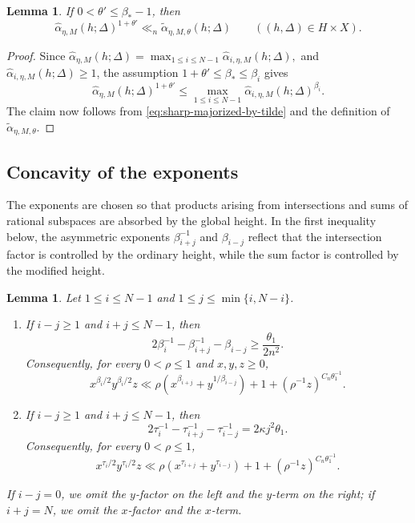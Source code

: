 \documentclass[reqno,11pt]{amsart}
\numberwithin{equation}{section}
\newtheorem{lemma}[theorem]{Lemma}
\theoremstyle{definition}
\theoremstyle{remark}
\begin{document}
\begin{lemma}\label{lem:hatalpha-majorized-by-tilde}
If $0<\theta'\le \beta_*-1$, then
$$
\widehat\alpha_{\eta,M}(h;\Delta)^{1+\theta'}
\ll_n
\widetilde\alpha_{\eta,M,\theta}(h;\Delta)
\qquad ((h,\Delta)\in H\times X).
$$
\end{lemma}

\begin{proof}
Since
$
\widehat\alpha_{\eta,M}(h;\Delta)
=
\max_{1\le i\le N-1}
\widehat\alpha_{i,\eta,M}(h;\Delta),
$
and $\widehat\alpha_{i,\eta,M}(h;\Delta)\ge1$, the assumption
$1+\theta'\le\beta_*\le\beta_i$ gives
$$
\widehat\alpha_{\eta,M}(h;\Delta)^{1+\theta'}
\le
\max_{1\le i\le N-1}
\widehat\alpha_{i,\eta,M}(h;\Delta)^{\beta_i}.
$$
The claim now follows from \eqref{eq:sharp-majorized-by-tilde} and the
definition of $\widetilde\alpha_{\eta,M,\theta}$.
\end{proof}

\subsection{Concavity of the exponents}
The exponents are chosen so that products arising from intersections and
sums of rational subspaces are absorbed by the global height. In the first
inequality below, the asymmetric exponents $\beta_{i+j}^{-1}$ and
$\beta_{i-j}$ reflect that the intersection factor is controlled by the
ordinary height, while the sum factor is controlled by the modified
height.

\begin{lemma}\label{lem:exponent-concavity}
Let $1\le i\le N-1$ and $1\le j\le\min\{i,N-i\}$.

\begin{enumerate}
\item If $i-j\ge1$ and $i+j\le N-1$, then
\begin{equation}\label{eq:beta-concavity}
2\beta_i^{-1}-\beta_{i+j}^{-1}-\beta_{i-j}
\ge \frac{\theta_1}{2n^2}.
\end{equation}
Consequently, for every $0<\rho\le1$ and $x,y,z\ge0$,
\begin{equation}\label{eq:Youngineq}
x^{\beta_i/2}y^{\beta_i/2}z
\ll
\rho\left(x^{\beta_{i+j}}+y^{1/\beta_{i-j}}\right)
+
1+\left(\rho^{-1}z\right)^{C_n\theta_1^{-1}}.
\end{equation}

\item If $i-j\ge1$ and $i+j\le N-1$, then
\begin{equation}\label{eq:tau-concavity}
2\tau_i^{-1}-\tau_{i+j}^{-1}-\tau_{i-j}^{-1}
=2\kappa j^2\theta_1.
\end{equation}
Consequently, for every $0<\rho\le1$,
\begin{equation}\label{eq:Youngineq'}
x^{\tau_i/2}y^{\tau_i/2}z
\ll
\rho\left(x^{\tau_{i+j}}+y^{\tau_{i-j}}\right)
+
1+\left(\rho^{-1}z\right)^{C_n\theta_1^{-1}}.
\end{equation}
\end{enumerate}
If $i-j=0$, we omit the $y$-factor on the left and the $y$-term on the
right; if $i+j=N$, we omit the $x$-factor and the $x$-term. \end{lemma}
\end{document}
